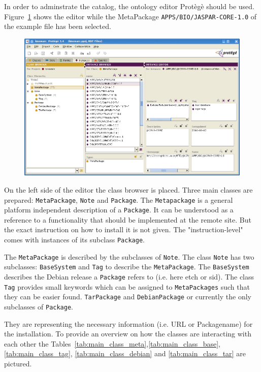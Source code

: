 In order to adminstrate the catalog, the ontology editor Prot\`eg\`e should be used. Figure~\ref{fig:protege_example} shows the
editor while the MetaPackage \texttt{APPS/BIO/JASPAR-CORE-1.0} of the example file has been selected.
\begin{figure}
  \begin{center}
    \includegraphics[width=\textwidth]{images/protege_JASPAR.png}
    \label{fig:protege_example}
  \end{center}
\end{figure}
On the left side of the editor the class browser is placed. Three
main classes are prepared: \texttt{MetaPackage}, \texttt{Note} and
\texttt{Package}.  The \texttt{Metapackage} is a general platform
independent description of a \texttt{Package}. It can be understood as
a reference to a functionality that should be implemented at the remote
site. But the exact instruction on how to install it is not given.
The "instruction-level" comes with instances of its subclass
\texttt{Package}.

The \texttt{MetaPackage} is described by the subclasses of \texttt{Note}.
The class \texttt{Note} has two subclasses: \texttt{BaseSystem} 
and \texttt{Tag} to describe the \texttt{MetaPackage}. The \texttt{BaseSystem}
describes the Debian release a \texttt{Package} refers to
(i.e. here etch or sid). The class \texttt{Tag} provides small keywords
which can be assigned to \texttt{MetaPackages} such that
they can be easier found.  \texttt{TarPackage} and \texttt{DebianPackage} or
currently the only subclasses of \texttt{Package}.

They are representing the necessary information (i.e. URL or Packagename)
for the installation. To provide an overview on how the classes are
interacting with each other the Tables~\ref{tab:main_class_meta},\ref{tab:main_class_base}, \ref{tab:main_class_tag},
\ref{tab:main_class_debian} and \ref{tab:main_class_tar} are pictured.

